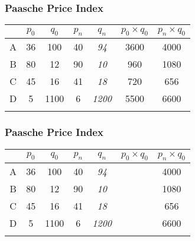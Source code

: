 \documentclass{beamer}
\begin{document}
\begin{frame}
\frametitle{Paasche Price Index}
\begin{center}
\LARGE
\begin{tabular}{|c||c|c||c|c||c|c|}
\hline  &\phantom{s}$p_0$\phantom{s}	&	$q_0$	&	$p_n$	&	$q_n$	&	$p_0 \times q_0$	&	$p_n \times q_0$	\\	\hline
A & 36	&	100	&	40	&	\textit{94}	&	3600	&	4000	\\	\hline
B & 80	&	12	&	90	&	\textit{10}	&	960	&	1080	\\	\hline
C & 45	&	16	&	41	&	\textit{18}	&	720	&	656	\\	\hline
D & 5	&	1100	&	6	&	\textit{1200}	&	5500	&	6600	\\	\hline
& 	&		&		&		&	\phantom{10780}	& \phantom{12336}		\\	\hline
\end{tabular} 
\end{center}
\end{frame}
\begin{frame}
\frametitle{Paasche Price Index}
\begin{center}
\LARGE
\begin{tabular}{|c||c|c||c|c||c|c|}
\hline  &\phantom{s}$p_0$\phantom{s}	&	$q_0$	&	$p_n$	&	$q_n$	&	$p_0 \times q_0$	&	$p_n \times q_0$	\\	\hline
A & 36	&	100	&	40	&	\textit{94}	&	\textbf{{\color{red}{3600}}}	&	4000	\\	\hline
B & 80	&	12	&	90	&	\textit{10}	& \textbf{{\color{red}{960}}}		&	1080	\\	\hline
C & 45	&	16	&	41	&	\textit{18}	& \textbf{{\color{red}{720}}}		&	656	\\	\hline
D & 5	&	1100	&	6	&	\textit{1200}	&	\textbf{{\color{red}{5500}}} 	&	6600	\\	\hline
& 	&		&		&		&	\phantom{10780}	& \phantom{12336}		\\	\hline
\end{tabular} 
\end{center}
\end{frame}
\end{document}

